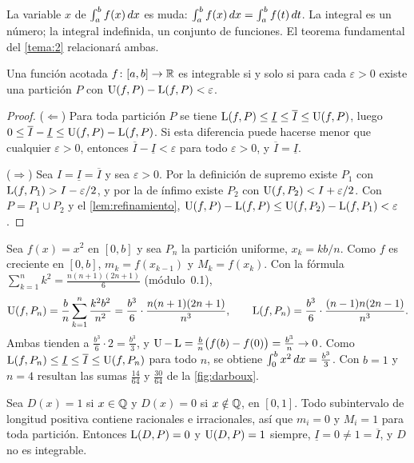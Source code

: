 La variable $x$ de $\int_a^b f(x)\mathop{}\!d x$ es muda: $\int_a^b f(x)\mathop{}\!d x=\int_a^b f(t)\mathop{}\!d t$. La integral es un número; la integral indefinida, un conjunto de funciones. El teorema fundamental del \cref{tema:2} relacionará ambas.

\begin{teorema}\label{teo:criterio}
Una función acotada $f\colon[a,b]\to\mathbb{R}$ es integrable si y solo si para cada $\varepsilon>0$ existe una partición $P$ con $\operatorname{U}(f,P)-\operatorname{L}(f,P)<\varepsilon$.
\end{teorema}

\begin{proof}
($\Leftarrow$) Para toda partición $P$ se tiene $\operatorname{L}(f,P)\le\underline{I}\le\overline{I}\le\operatorname{U}(f,P)$, luego $0\le\overline{I}-\underline{I}\le\operatorname{U}(f,P)-\operatorname{L}(f,P)$. Si esta diferencia puede hacerse menor que cualquier $\varepsilon>0$, entonces $\overline{I}-\underline{I}<\varepsilon$ para todo $\varepsilon>0$, y $\overline{I}=\underline{I}$.

($\Rightarrow$) Sea $I=\underline{I}=\overline{I}$ y sea $\varepsilon>0$. Por la definición de supremo existe $P_1$ con $\operatorname{L}(f,P_1)>I-\varepsilon/2$, y por la de ínfimo existe $P_2$ con $\operatorname{U}(f,P_2)<I+\varepsilon/2$. Con $P=P_1\cup P_2$ y el \cref{lem:refinamiento},
$\operatorname{U}(f,P)-\operatorname{L}(f,P)\le\operatorname{U}(f,P_2)-\operatorname{L}(f,P_1)<\varepsilon$.
\end{proof}

\begin{ejemplo}[Integral de $x^{2}$]\label{ej:x2}
Sea $f(x)=x^{2}$ en $[0,b]$ y sea $P_n$ la partición uniforme, $x_k=kb/n$. Como $f$ es creciente en $[0,b]$, $m_k=f(x_{k-1})$ y $M_k=f(x_k)$. Con la fórmula $\sum_{k=1}^{n}k^{2}=\frac{n(n+1)(2n+1)}{6}$ (módulo~0.1),
\[
\operatorname{U}(f,P_n)=\frac{b}{n}\sum_{k=1}^{n}\frac{k^{2}b^{2}}{n^{2}}=\frac{b^{3}}{6}\cdot\frac{n(n+1)(2n+1)}{n^{3}},\qquad
\operatorname{L}(f,P_n)=\frac{b^{3}}{6}\cdot\frac{(n-1)n(2n-1)}{n^{3}}.
\]
Ambas tienden a $\frac{b^{3}}{6}\cdot2=\frac{b^{3}}{3}$, y $\operatorname{U}-\operatorname{L}=\frac{b}{n}\bigl(f(b)-f(0)\bigr)=\frac{b^{3}}{n}\to0$. Como $\operatorname{L}(f,P_n)\le\underline{I}\le\overline{I}\le\operatorname{U}(f,P_n)$ para todo $n$, se obtiene $\int_0^b x^{2}\mathop{}\!d x=\frac{b^{3}}{3}$. Con $b=1$ y $n=4$ resultan las sumas $\frac{14}{64}$ y $\frac{30}{64}$ de la \cref{fig:darboux}.
\end{ejemplo}

\begin{ejemplo}\label{ej:dirichlet}
Sea $D(x)=1$ si $x\in\mathbb{Q}$ y $D(x)=0$ si $x\notin\mathbb{Q}$, en $[0,1]$. Todo subintervalo de longitud positiva contiene racionales e irracionales, así que $m_i=0$ y $M_i=1$ para toda partición. Entonces $\operatorname{L}(D,P)=0$ y $\operatorname{U}(D,P)=1$ siempre, $\underline{I}=0\neq1=\overline{I}$, y $D$ no es integrable.
\end{ejemplo}

